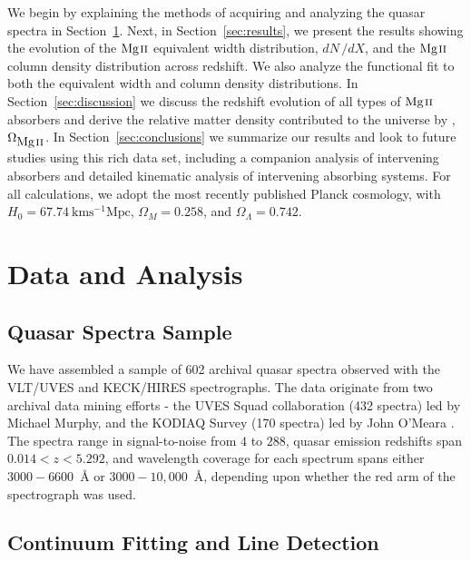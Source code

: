 \documentclass[iop,apj,numberedappendix,appendixfloats,twocolappendix]{emulateapj}
\begin{document}
We begin by explaining the methods of acquiring and analyzing the quasar spectra in Section~\ref{sec:data}. Next, in Section~\ref{sec:results}, we present the results showing the evolution of the ${\hbox{{\rm Mg}\kern 0.1em{\sc ii}}}$ equivalent width distribution, $dN\,/dX$, and the ${\hbox{{\rm Mg}\kern 0.1em{\sc ii}}}$ column density distribution across redshift. We also analyze the functional fit to both the equivalent width and column density distributions. In Section~\ref{sec:discussion} we discuss the redshift evolution of all types of ${\hbox{{\rm Mg}\kern 0.1em{\sc ii}}}$ absorbers and derive the relative matter density contributed to the universe by {\MgII}, $\Omega_{\hbox{{\rm Mg}\kern 0.1em{\sc ii}}}$. In Section~\ref{sec:conclusions} we summarize our results and look to future studies using this rich data set, including a companion analysis of intervening {\CIV} absorbers and detailed kinematic analysis of intervening absorbing systems. For all calculations, we adopt the most recently published Planck cosmology, with $H_0 = 67.74~\mathrm{km s^{-1} Mpc}$, $\Omega_M = 0.258$, and $\Omega_{\Lambda} = 0.742$.


\section{Data and Analysis}
\label{sec:data}

\subsection{Quasar Spectra Sample}

We have assembled a sample of 602 archival quasar spectra observed with the VLT/UVES and KECK/HIRES spectrographs. The data originate from two archival data mining efforts - the UVES Squad collaboration (432 spectra) led by Michael Murphy, and the KODIAQ Survey (170 spectra) led by John O'Meara \citep{OMeara2015}. The spectra range in signal-to-noise from $4$ to $288$, quasar emission redshifts span $0.014 < z < 5.292$, and wavelength coverage for each spectrum spans either $3000 - 6600$~{\AA} or $3000 - 10,000$~{\AA}, depending upon whether the red arm of the spectrograph was used.


\subsection{Continuum Fitting and Line Detection}
\label{sec:detection}
\end{document}
